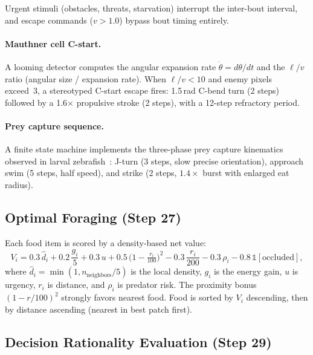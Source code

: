 \documentclass[11pt,a4paper]{article}
\begin{document}
Urgent stimuli (obstacles, threats, starvation) interrupt the inter-bout
interval, and escape commands ($v > 1.0$) bypass bout timing entirely.

\paragraph{Mauthner cell C-start.}
A looming detector computes the angular expansion rate
$\dot{\theta} = d\theta/dt$ and the $\ell/v$ ratio (angular size /
expansion rate).  When $\ell/v < 10$ and enemy pixels exceed~3,
a stereotyped C-start escape fires: 1.5\,rad C-bend turn (2 steps)
followed by a 1.6$\times$ propulsive stroke (2 steps), with a
12-step refractory period.

\paragraph{Prey capture sequence.}
A finite state machine implements the three-phase prey capture
kinematics observed in larval zebrafish~\cite{bianco2015}:
J-turn (3 steps, slow precise orientation), approach swim (5 steps,
half speed), and strike (2 steps, $1.4\times$ burst with enlarged
eat radius).

\subsection{Optimal Foraging (Step 27)}\label{sec:optimal_foraging}

Each food item is scored by a density-based net value:
\begin{equation}\label{eq:optimal_foraging}
  V_i = 0.3\,\hat{d}_i + 0.2\,\frac{g_i}{5} + 0.3\,u
      + 0.5\,\bigl(1 - \tfrac{r_i}{100}\bigr)^2
      - 0.3\,\frac{r_i}{200} - 0.3\,\rho_i
      - 0.8\,\mathbb{1}[\text{occluded}],
\end{equation}
where $\hat{d}_i = \min(1, n_\text{neighbors}/5)$ is the local density,
$g_i$ is the energy gain, $u$ is urgency, $r_i$ is distance, and
$\rho_i$ is predator risk.  The proximity bonus $(1-r/100)^2$
strongly favors nearest food.
Food is sorted by $V_i$ descending, then by distance ascending
(nearest in best patch first).

\subsection{Decision Rationality Evaluation (Step 29)}\label{sec:rationality}
\end{document}
